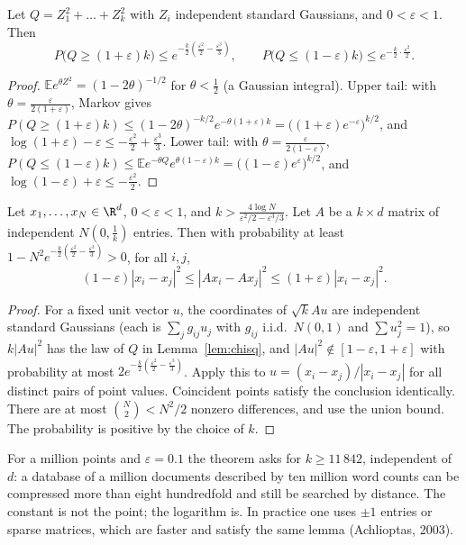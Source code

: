 \begin{lemma}\label{lem:chisq}
Let $Q=Z_1^2+\dots+Z_k^2$ with $Z_i$ independent standard Gaussians, and $0<\varepsilon<1$. Then
\[
P\bigl(Q\ge(1+\varepsilon)k\bigr)\le e^{-\frac k2(\frac{\varepsilon^2}2-\frac{\varepsilon^3}3)},\qquad P\bigl(Q\le(1-\varepsilon)k\bigr)\le e^{-\frac k2\cdot\frac{\varepsilon^2}2}.
\]
\end{lemma}
\begin{proof}
$\mathbb Ee^{\theta Z^2}=(1-2\theta)^{-1/2}$ for $\theta<\frac12$ (a Gaussian integral). Upper tail: with $\theta=\frac\varepsilon{2(1+\varepsilon)}$, Markov gives
$P(Q\ge(1+\varepsilon)k)\le(1-2\theta)^{-k/2}e^{-\theta(1+\varepsilon)k}=\bigl((1+\varepsilon)e^{-\varepsilon}\bigr)^{k/2}$, and $\log(1+\varepsilon)-\varepsilon\le-\frac{\varepsilon^2}2+\frac{\varepsilon^3}3$. Lower tail: with
$\theta=\frac\varepsilon{2(1-\varepsilon)}$, $P(Q\le(1-\varepsilon)k)\le\mathbb Ee^{-\theta Q}e^{\theta(1-\varepsilon)k}=\bigl((1-\varepsilon)e^{\varepsilon}\bigr)^{k/2}$, and $\log(1-\varepsilon)+\varepsilon\le-\frac{\varepsilon^2}2$.
\end{proof}

\begin{theorem}\label{thm:jl}
Let $x_1,\dots,x_N\in\R^d$, $0<\varepsilon<1$, and $k>\frac{4\log N}{\varepsilon^2/2-\varepsilon^3/3}$. Let $A$ be a $k\times d$ matrix of independent $N(0,\frac1k)$ entries. Then with probability
at least $1-N^2e^{-\frac k2(\frac{\varepsilon^2}2-\frac{\varepsilon^3}3)}>0$, for all $i,j$,
\[
(1-\varepsilon)|x_i-x_j|^2\le|Ax_i-Ax_j|^2\le(1+\varepsilon)|x_i-x_j|^2.
\]
\end{theorem}
\begin{proof}
For a fixed unit vector $u$, the coordinates of $\sqrt kAu$ are independent standard Gaussians (each is $\sum_jg_{ij}u_j$ with $g_{ij}$ i.i.d.\ $N(0,1)$ and $\sum u_j^2=1$),
so $k|Au|^2$ has the law of $Q$ in Lemma~\ref{lem:chisq}, and $|Au|^2\notin[1-\varepsilon,1+\varepsilon]$ with probability at most $2e^{-\frac k2(\frac{\varepsilon^2}2-\frac{\varepsilon^3}3)}$. Apply this to $u=(x_i-x_j)/|x_i-x_j|$ for all distinct pairs of point values. Coincident points satisfy the conclusion identically. There are at most $\binom N2<N^2/2$ nonzero differences, and use the union bound. The probability is positive by the choice of $k$.
\end{proof}

For a million points and $\varepsilon=0.1$ the theorem asks for $k\ge11\,842$, independent of $d$: a database of a million documents described by ten million word counts
can be compressed more than eight hundredfold and still be searched by distance. The constant is not the point; the logarithm is. In practice one uses $\pm1$ entries or sparse
matrices, which are faster and satisfy the same lemma (Achlioptas, 2003).

